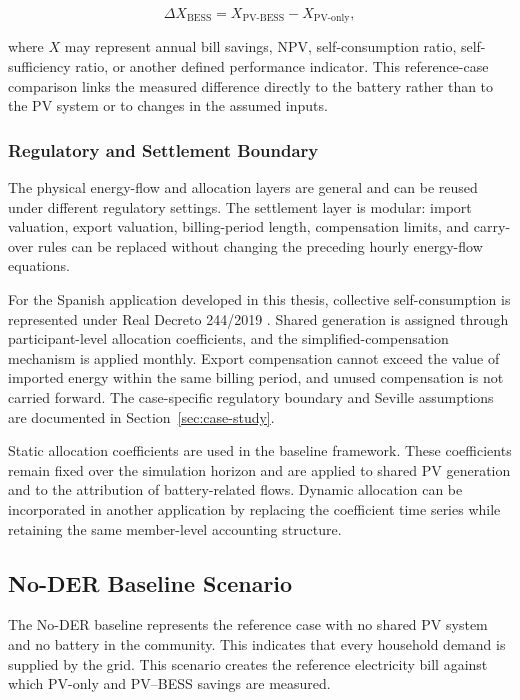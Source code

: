 \begin{equation}
\label{eq:delta_x_bess}
\Delta X_{\mathrm{BESS}} = X_{\mathrm{PV\mbox{-}BESS}} - X_{\mathrm{PV\mbox{-}only}},
\end{equation}

where $X$ may represent annual bill savings, NPV, self-consumption ratio, self-sufficiency ratio, or another defined performance indicator. This reference-case comparison links the measured difference directly to the battery rather than to the PV system or to changes in the assumed inputs.

\subsubsection{Regulatory and Settlement Boundary}
\label{subsec:regulatory_settlement_boundary}

The physical energy-flow and allocation layers are general and can be reused under different regulatory settings. The settlement layer is modular: import valuation, export valuation, billing-period length, compensation limits, and carry-over rules can be replaced without changing the preceding hourly energy-flow equations.

For the Spanish application developed in this thesis, collective self-consumption is represented under Real Decreto 244/2019 \cite{boe2019real}. Shared generation is assigned through participant-level allocation coefficients, and the simplified-compensation mechanism is applied monthly. Export compensation cannot exceed the value of imported energy within the same billing period, and unused compensation is not carried forward. The case-specific regulatory boundary and Seville assumptions are documented in Section~\ref{sec:case-study}.

Static allocation coefficients are used in the baseline framework. These coefficients remain fixed over the simulation horizon and are applied to shared PV generation and to the attribution of battery-related flows. Dynamic allocation can be incorporated in another application by replacing the coefficient time series while retaining the same member-level accounting structure.

\subsection{No-DER Baseline Scenario}
\label{sec:no_der_baseline_ch4}

The No-DER baseline represents the reference case with no shared PV system and no battery in the community. This indicates that every household demand is supplied by the grid. This scenario creates the reference electricity bill against which PV-only and PV--BESS savings are measured.

